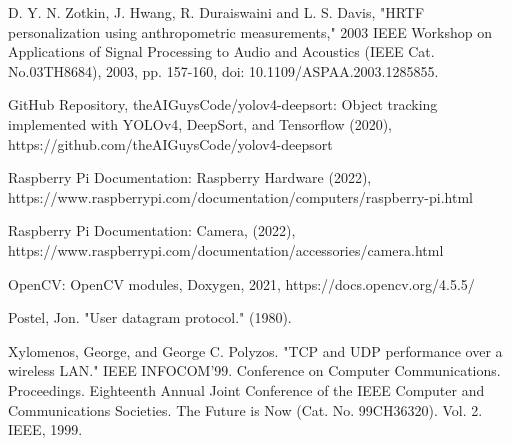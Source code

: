 \documentclass{ctuthesis}
\begin{document}
\begin{thebibliography}{1}
 D. Y. N. Zotkin, J. Hwang, R. Duraiswaini and L. S. Davis, "HRTF personalization using anthropometric measurements," 2003 IEEE Workshop on Applications of Signal Processing to Audio and Acoustics (IEEE Cat. No.03TH8684), 2003, pp. 157-160, doi: 10.1109/ASPAA.2003.1285855.

 GitHub Repository, theAIGuysCode/yolov4-deepsort: Object tracking implemented with YOLOv4, DeepSort, and Tensorflow (2020), https://github.com/theAIGuysCode/yolov4-deepsort

  Raspberry Pi Documentation: Raspberry Hardware (2022), https://www.raspberrypi.com/documentation/computers/raspberry-pi.html

  Raspberry Pi Documentation: Camera, (2022), https://www.raspberrypi.com/documentation/accessories/camera.html
 
  OpenCV: OpenCV modules, Doxygen, 2021, https://docs.opencv.org/4.5.5/
 
  Postel, Jon. "User datagram protocol." (1980).
 
  Xylomenos, George, and George C. Polyzos. "TCP and UDP performance over a wireless LAN." IEEE INFOCOM'99. Conference on Computer Communications. Proceedings. Eighteenth Annual Joint Conference of the IEEE Computer and Communications Societies. The Future is Now (Cat. No. 99CH36320). Vol. 2. IEEE, 1999.



\end{thebibliography}
\end{document}
